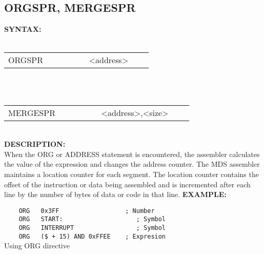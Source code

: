                 \subsection{ORGSPR, MERGESPR}
                \textbf{SYNTAX:}\\
                \\ {
                        \texttt{}
                        \begin{tabular}[h!]{llll}
                                { \color{highlight_directive} ORGSPR } & \verb'         '
                                { \color{highlight_constant} <address> } & { \color{highlight_comment}  }\\
                        \end{tabular}
                    }\\
                \\ {
                        \texttt{}
                        \begin{tabular}[h!]{llll}
                                { \color{highlight_directive} MERGESPR } & \verb'         '
                                { \color{highlight_constant} <address>,<size> } & { \color{highlight_comment}  }\\
                        \end{tabular}
                    }\\
                \textbf{DESCRIPTION:}\\
                When the ORG or ADDRESS statement is encountered, the assembler calculates the value of the expression and changes the address counter.
                The MDS assembler maintains a location counter for each segment. The location counter contains the offset of the instruction or data
                being assembled and is incremented after each line by the number of bytes of data or code in that line.
                \textbf{EXAMPLE:}\\
                        \begin{code}[h!]
                                \verb'    '{\color{highlight_directive}\verb'ORG'}\verb'   '{\color{highlight_constant}\verb'0x3FF'}\verb'                  '{\color{highlight_comment}\verb'; Number'}\\
                                \verb'    '{\color{highlight_directive}\verb'ORG'}\verb'   '{\color{highlight_label}\verb'START:'}\verb'                    '{\color{highlight_comment}\verb'; Symbol'}\\
                                \verb'    '{\color{highlight_directive}\verb'ORG'}\verb'   '{\color{highlight_label}\verb'INTERRUPT'}\verb'                 '{\color{highlight_comment}\verb'; Symbol'}\\
                                \verb'    '{\color{highlight_directive}\verb'ORG'}\verb'   '{\color{highlight_constant}\verb'($ + 15) AND 0xFFEE'}\verb'    '{\color{highlight_comment}\verb'; Expresion'}\\
                        \caption{Using ORG directive}
                        \end{code}
